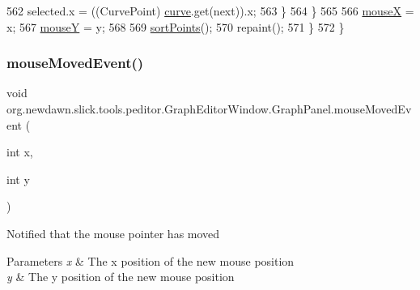 \begin{DoxyCode}
562                             selected.x = ((CurvePoint) \mbox{\hyperlink{classorg_1_1newdawn_1_1slick_1_1tools_1_1peditor_1_1_graph_editor_window_1_1_graph_panel_ac95a7a77b5e8460041f157c02e19d2bb}{curve}}.get(next)).x;
563                     \}
564                 \}
565 
566                 \mbox{\hyperlink{classorg_1_1newdawn_1_1slick_1_1tools_1_1peditor_1_1_graph_editor_window_1_1_graph_panel_ab69722127025b04438af3ce7858928c4}{mouseX}} = x;
567                 \mbox{\hyperlink{classorg_1_1newdawn_1_1slick_1_1tools_1_1peditor_1_1_graph_editor_window_1_1_graph_panel_a645c35775cd9ec2cbea8d05a0af9c793}{mouseY}} = y;
568 
569                 \mbox{\hyperlink{classorg_1_1newdawn_1_1slick_1_1tools_1_1peditor_1_1_graph_editor_window_1_1_graph_panel_a5ba3db2ef0241983db9623b2164bab0f}{sortPoints}}();
570                 repaint();
571             \}
572         \}
\end{DoxyCode}
\mbox{\label{classorg_1_1newdawn_1_1slick_1_1tools_1_1peditor_1_1_graph_editor_window_1_1_graph_panel_a07bb6aa0290d522eeca396a8aa39905f}} 
\subsubsection{\texorpdfstring{mouse\+Moved\+Event()}{mouseMovedEvent()}}
{\footnotesize\ttfamily void org.\+newdawn.\+slick.\+tools.\+peditor.\+Graph\+Editor\+Window.\+Graph\+Panel.\+mouse\+Moved\+Event (\begin{DoxyParamCaption}\item[{int}]{x,  }\item[{int}]{y }\end{DoxyParamCaption})\hspace{0.3cm}{\ttfamily [inline]}}

Notified that the mouse pointer has moved


\begin{DoxyParams}{Parameters}
{\em x} & The x position of the new mouse position \\
\hline
{\em y} & The y position of the new mouse position \\
\hline
\end{DoxyParams}

